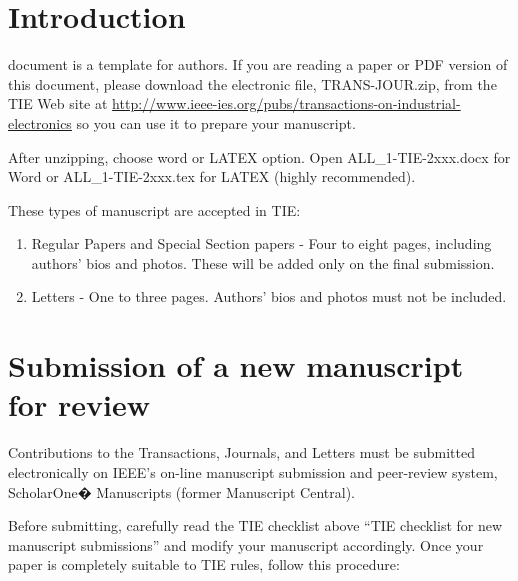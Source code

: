 \documentclass[journal]{IEEEtranTIE}
\begin{document}
%
{}


\section{Introduction}

 document is a template for authors. If you are reading a paper or PDF version of this document, please download the electronic file, TRANS-JOUR.zip, from the TIE Web site at \url{http://www.ieee-ies.org/pubs/transactions-on-industrial-electronics} so you can use it to prepare your manuscript.

After unzipping, choose word or LATEX option. Open ALL\_1-TIE-2xxx.docx for Word or ALL\_1-TIE-2xxx.tex for LATEX (highly recommended).

These types of manuscript are accepted in TIE:


\begin{enumerate}[1)]
	\item Regular Papers and Special Section papers - Four to eight pages, including authors' bios and photos. These will be added only on the final submission.
	\item Letters - One to three pages. Authors' bios and photos must not be included.
\end{enumerate}


\section{Submission of a new manuscript for review}

Contributions to the Transactions, Journals, and Letters must be submitted electronically on IEEE's on-line manuscript submission and peer-review system, ScholarOne� Manuscripts (former Manuscript Central).

Before submitting, carefully read the TIE checklist above ``TIE checklist for new manuscript submissions'' and modify your manuscript accordingly. Once your paper is completely suitable to TIE rules, follow this procedure:
\end{document}
